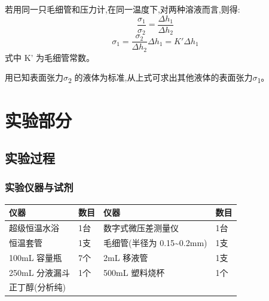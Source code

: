 \documentclass[11pt]{report}
\begin{document}
若用同一只毛细管和压力计,在同一温度下,对两种溶液而言,则得:
\[
\frac{\sigma_{1}}{\sigma_{2}}=\frac{\Delta h_{1}}{\Delta h_{2}}
\]
\[
\sigma_{1}=\frac{\sigma_{2}}{\Delta h_{2}}\Delta h_{1}=K'\Delta h_{1}
\]
式中 K' 为毛细管常数。

用已知表面张力\(\sigma\)\textsubscript{2} 的液体为标准,从上式可求出其他液体的表面张力\(\sigma\)\textsubscript{1}。




\part{实验部分}
\label{sec:org648ea67}
\chapter{实验过程}
\label{sec:org273cbdb}
\section{实验仪器与试剂}
\label{sec:orgcc19e9d}
\begin{center}
\begin{tabular}{llll}
仪器 & 数目 & 仪器 & 数目\\
\hline
超级恒温水浴 & 1台 & 数字式微压差测量仪 & 1台\\
恒温套管 & 1支 & 毛细管(半径为 0.15\textasciitilde{}0.2mm) & 1支\\
100mL 容量瓶 & 7个 & 2mL 移液管 & 1支\\
250mL 分液漏斗 & 1个 & 500mL 塑料烧杯 & 1个\\
正丁醇(分析纯) &  &  & \\
\end{tabular}
\end{center}
\end{document}

